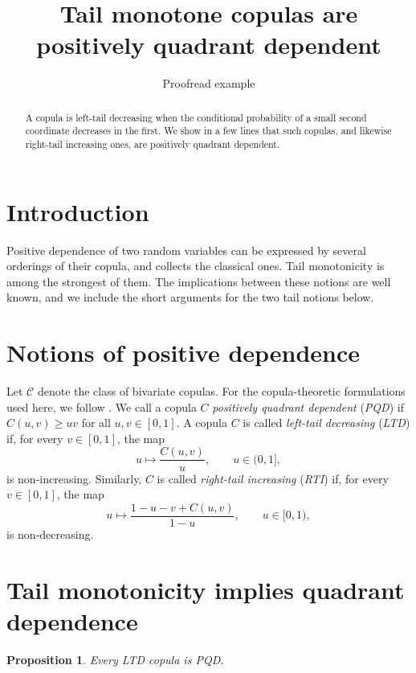 \documentclass{article}
\title{Tail monotone copulas are positively quadrant dependent}
\author{Proofread example}
\date{}
\newtheorem{proposition}{Proposition}
\newcommand{\CC}{\mathcal{C}}
\begin{document}
\maketitle

\begin{abstract}
A copula is left-tail decreasing when the conditional probability of a small second coordinate decreases in the first.
We show in a few lines that such copulas, and likewise right-tail increasing ones, are positively quadrant dependent.
\end{abstract}

\section{Introduction}

Positive dependence of two random variables can be expressed by several orderings of their copula, and \cite[Ch.~5]{nelsen2006introduction} collects the classical ones.
Tail monotonicity is among the strongest of them.
The implications between these notions are well known, and we include the short arguments for the two tail notions below.

\section{Notions of positive dependence}

Let $\CC$ denote the class of bivariate copulas.
For the copula-theoretic formulations used here, we follow \cite[Ch.~5]{nelsen2006introduction}.
We call a copula $C$ \emph{positively quadrant dependent} (\emph{PQD}) if $C(u,v)\ge uv$ for all $u,v\in[0,1]$.
A copula $C$ is called \emph{left-tail decreasing} (\emph{LTD}) if, for every $v\in[0,1]$, the map
\begin{equation}\label{eq:ltd}
u\longmapsto\frac{C(u,v)}{u},\qquad u\in(0,1],
\end{equation}
is non-increasing.
Similarly, $C$ is called \emph{right-tail increasing} (\emph{RTI}) if, for every $v\in[0,1]$, the map
\begin{equation}\label{eq:rti}
u\longmapsto\frac{1-u-v+C(u,v)}{1-u},\qquad u\in[0,1),
\end{equation}
is non-decreasing.

\section{Tail monotonicity implies quadrant dependence}

\begin{proposition}\label{prop:ltd}
Every LTD copula is PQD.
\end{proposition}
\end{document}
